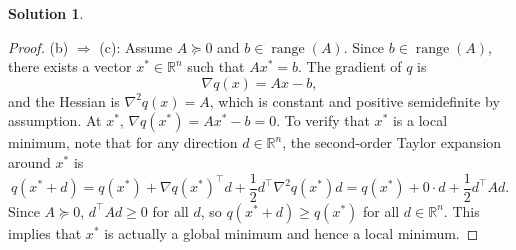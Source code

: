 \documentclass[12pt]{article}
\theoremstyle{definition}
\newtheorem*{solution}{\normalfont\textbf{Solution}}
\DeclareMathOperator{\range}{range}
\begin{document}
\begin{enumerate}[leftmargin=*]
\begin{solution}
\begin{proof}
            \noindent
            (b) \(\Rightarrow\) (c): Assume \( A \succeq 0 \) and \( b \in \range(A) \). Since \( b \in \range(A) \), there exists a vector \( x^* \in \mathbb{R}^n \) such that \( A x^* = b \). The gradient of \( q \) is
            \[
            \nabla q(x) = A x - b,
            \]
            and the Hessian is \( \nabla^2 q(x) = A \), which is constant and positive semidefinite by assumption. At \( x^* \), \( \nabla q(x^*) = A x^* - b = 0 \). To verify that \( x^* \) is a local minimum, note that for any direction \( d \in \mathbb{R}^n \), the second-order Taylor expansion around \( x^* \) is
            \[
            q(x^* + d) = q(x^*) + \nabla q(x^*)^\top d + \frac{1}{2} d^\top \nabla^2 q(x^*) d = q(x^*) + 0 \cdot d + \frac{1}{2} d^\top A d.
            \]
            Since \( A \succeq 0 \), \( d^\top A d \geq 0 \) for all \( d \), so \( q(x^* + d) \geq q(x^*) \) for all \( d \in \mathbb{R}^n \). This implies that \( x^* \) is actually a global minimum and hence a local minimum. 


\end{proof}
\end{solution}
\end{enumerate}
\end{document}
